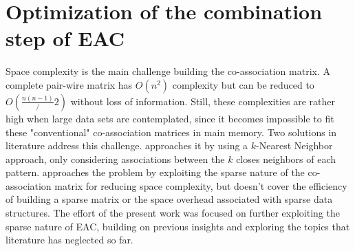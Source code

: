 

\section{Optimization of the combination step of EAC}
\label{sec:imple}

Space complexity is the main challenge building the co-association matrix.
A complete pair-wire matrix has $O(n^2)$ complexity but can be reduced to $O(\frac{n(n-1)}/2)$ without loss of information.
Still, these complexities are rather high when large data sets are contemplated, since it becomes impossible to fit these "conventional" co-association matrices in main memory.
Two solutions in literature address this challenge.
\cite{Fred2005} approaches it by using a $k$-Nearest Neighbor approach, only considering associations between the $k$ closes neighbors of each pattern.
\cite{Lourenco2010} approaches the problem by exploiting the sparse nature of the co-association matrix for reducing space complexity, but doesn't cover the efficiency of building a sparse matrix or the space overhead associated with sparse data structures.
The effort of the present work was focused on further exploiting the sparse nature of EAC, building on previous insights and exploring the topics that literature has neglected so far.

